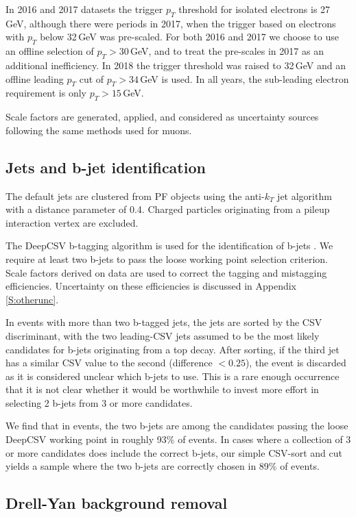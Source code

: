  In 2016 and 2017 datasets the trigger $p_T$ threshold for isolated electrons is 27\,GeV, although there were periods in 2017, when the trigger based on electrons with  $p_T$ below  32\,GeV was pre-scaled. For both 2016 and 2017 we choose to use an offline selection of  $p_T > 30$\,GeV, and to treat the pre-scales in 2017 as an additional inefficiency. In 2018 the  trigger threshold was raised to 32\,GeV and an offline leading $p_T$ cut of $p_T>34$\,GeV is used. In all years, the sub-leading electron requirement is only $p_T>15$\,GeV.

 Scale factors are generated, applied, and considered as uncertainty sources following the same methods used for muons.

\subsection{Jets and b-jet identification}
The default jets are clustered from PF objects using the anti-$k_T$ jet algorithm with a distance parameter of 0.4. Charged particles originating from a pileup interaction vertex are excluded. 

The DeepCSV b-tagging algorithm  is used for the identification of b-jets \cite{deepCSVref}. We require at least two b-jets to pass the loose working point selection criterion. Scale factors derived on data are used to correct the tagging and mistagging efficiencies. Uncertainty on these efficiencies is discussed in Appendix \ref{S:otherunc}.

 In events with more than two b-tagged jets, the jets are sorted by the CSV discriminant, with the two leading-CSV jets assumed to be the most likely candidates for b-jets originating from a top decay. After sorting, if the third jet has a similar CSV value to the second (difference $<0.25$), the event is discarded as it is considered unclear which b-jets to use. This is a rare enough occurrence that it is not clear whether it would be worthwhile to invest more effort in selecting 2 b-jets from 3 or more candidates. 
 
 We find that in \ttbar events, the two b-jets are among the candidates passing the loose DeepCSV working point in roughly 93\% of events. In cases where a collection of 3 or more candidates does include the correct b-jets, our simple CSV-sort and cut yields a \ttbar sample where the two b-jets are correctly chosen in 89\% of events.
   


\subsection*{Drell-Yan background removal}

